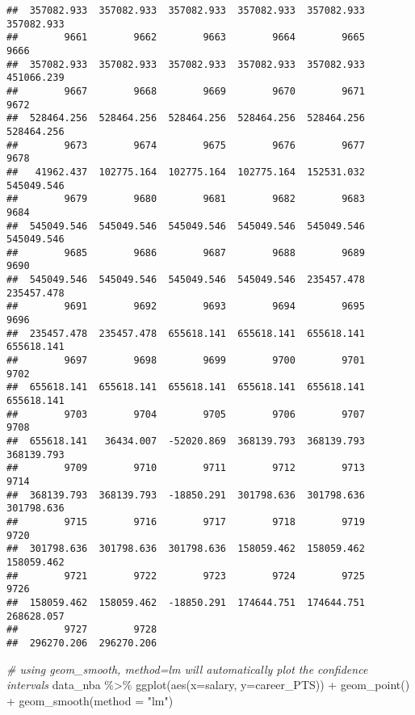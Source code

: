 \documentclass[
]{book}
\newenvironment{Shaded}{\begin{snugshade}}{\end{snugshade}}
\newcommand{\AttributeTok}[1]{\textcolor[rgb]{0.77,0.63,0.00}{#1}}
\newcommand{\CommentTok}[1]{\textcolor[rgb]{0.56,0.35,0.01}{\textit{#1}}}
\newcommand{\FunctionTok}[1]{\textcolor[rgb]{0.00,0.00,0.00}{#1}}
\newcommand{\NormalTok}[1]{#1}
\newcommand{\SpecialCharTok}[1]{\textcolor[rgb]{0.00,0.00,0.00}{#1}}
\newcommand{\StringTok}[1]{\textcolor[rgb]{0.31,0.60,0.02}{#1}}
\begin{document}
\begin{verbatim}
##  357082.933  357082.933  357082.933  357082.933  357082.933  357082.933 
##        9661        9662        9663        9664        9665        9666 
##  357082.933  357082.933  357082.933  357082.933  357082.933  451066.239 
##        9667        9668        9669        9670        9671        9672 
##  528464.256  528464.256  528464.256  528464.256  528464.256  528464.256 
##        9673        9674        9675        9676        9677        9678 
##   41962.437  102775.164  102775.164  102775.164  152531.032  545049.546 
##        9679        9680        9681        9682        9683        9684 
##  545049.546  545049.546  545049.546  545049.546  545049.546  545049.546 
##        9685        9686        9687        9688        9689        9690 
##  545049.546  545049.546  545049.546  545049.546  235457.478  235457.478 
##        9691        9692        9693        9694        9695        9696 
##  235457.478  235457.478  655618.141  655618.141  655618.141  655618.141 
##        9697        9698        9699        9700        9701        9702 
##  655618.141  655618.141  655618.141  655618.141  655618.141  655618.141 
##        9703        9704        9705        9706        9707        9708 
##  655618.141   36434.007  -52020.869  368139.793  368139.793  368139.793 
##        9709        9710        9711        9712        9713        9714 
##  368139.793  368139.793  -18850.291  301798.636  301798.636  301798.636 
##        9715        9716        9717        9718        9719        9720 
##  301798.636  301798.636  301798.636  158059.462  158059.462  158059.462 
##        9721        9722        9723        9724        9725        9726 
##  158059.462  158059.462  -18850.291  174644.751  174644.751  268628.057 
##        9727        9728 
##  296270.206  296270.206
\end{verbatim}

\begin{Shaded}
\begin{Highlighting}[]
\CommentTok{\# using geom\_smooth, method=lm will automatically plot the confidence intervals}
\NormalTok{data\_nba }\SpecialCharTok{\%\textgreater{}\%}
  \FunctionTok{ggplot}\NormalTok{(}\FunctionTok{aes}\NormalTok{(}\AttributeTok{x=}\NormalTok{salary, }\AttributeTok{y=}\NormalTok{career\_PTS)) }\SpecialCharTok{+}
  \FunctionTok{geom\_point}\NormalTok{() }\SpecialCharTok{+}
  \FunctionTok{geom\_smooth}\NormalTok{(}\AttributeTok{method =} \StringTok{"lm"}\NormalTok{)}
\end{Highlighting}
\end{Shaded}
\end{document}
